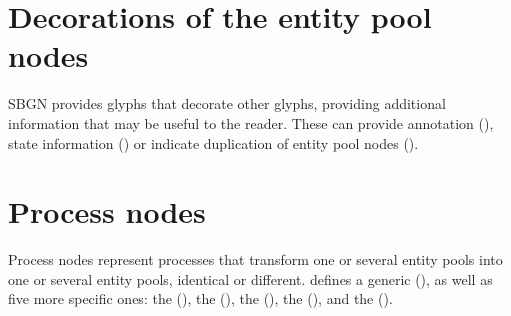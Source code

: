 








\section{Decorations of the entity pool nodes}\label{sec:decorations}

SBGN \PD provides glyphs that decorate other glyphs, providing additional information that may be useful to the reader. These can provide annotation (), state information () or indicate duplication of entity pool nodes ().







\section{Process nodes}\label{sec:PNs}
 
Process nodes represent processes that transform one or several entity pools into one or several entity pools, identical or different.  \SBGNPDLone defines a generic  (), as well as five more specific ones: the  (), the  (), the  (), the  (), and the  (). 
 







 
